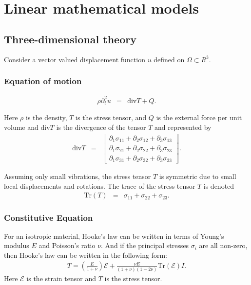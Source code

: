 \section{Linear mathematical models} \label{sec:LinearMathematicalModels}
	\subsection{Three-dimensional theory}
		Consider a vector valued displacement function $u$ defined on $\Omega \subset R^3$.

		\subsubsection*{Equation of motion}\label{ssec:3D_Model:EquationOfMotion}
		\begin{eqnarray}
			\rho\partial_t^2 u & = & \textrm{div}T + Q. \label{eq:3D_Model:EM}
		\end{eqnarray} \label{sym:rho} \label{sym:partial_diff} \label{sym:T} \label{sym:Q}

		Here $\rho$ is the density, $T$ is the stress tensor, and $Q$ is the external 
		force per unit volume and $\textrm{div}T$ is the divergence of the tensor $T$ and represented by
		\begin{eqnarray}
			\textrm{div}  T & = &
			\begin{bmatrix}
				\partial_1 \sigma_{11} + \partial_2 \sigma_{12} + \partial_3 \sigma_{13} \\
				\partial_1 \sigma_{21} + \partial_2 \sigma_{22} + \partial_3 \sigma_{23} \\
				\partial_1 \sigma_{31} + \partial_2 \sigma_{32} + \partial_3 \sigma_{33}
			\end{bmatrix}. \label{eq:3D_Model:divT}
		\end{eqnarray}

		Assuming only small vibrations, the stress tensor $T$ is symmetric due to small
		local displacements and rotations. The trace of the stress tensor $T$ is denoted
		\begin{eqnarray}
			\textrm{Tr}(T) & = & \sigma_{11} + \sigma_{22} + \sigma_{23}. \label{eq:stress_tensor_t}
		\end{eqnarray}

		\subsubsection*{Constitutive Equation}
			For an isotropic material, Hooke's law can be written in terms of Young's modulus $E$ and Poisson's ratio $\nu$. And if the principal stresses $\sigma_i$ are all non-zero, then Hooke's law can be written in the following form:
			\begin{eqnarray}
				T = \left( \frac{E}{1+\nu} \right)\mathcal{E} + \frac{\nu E}{(1+\nu)(1-2\nu)}\textrm{Tr}(\mathcal{E})I \label{eq:3D_Model:CE}.
			\end{eqnarray} Here $\mathcal{E}$ is the strain tensor and $T$ is the stress tensor.

